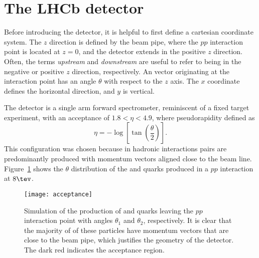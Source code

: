 \section{The LHCb detector}

Before introducing the \lhcb detector, it is helpful to first define a cartesian coordinate system.
The $z$ direction is defined by the \lhc beam pipe, where the $pp$ interaction point is located
at $z=0$, and the \lhcb detector extends in the positive $z$ direction.
Often, the terms \emph{upstream} and \emph{downstream} are useful to refer to being in the
negative or positive $z$ direction, respectively.
An vector originating at the interaction point has an angle $\theta$ with respect to the $z$ axis.
The $x$ coordinate defines the horizontal direction, and $y$ is vertical.

The \lhcb detector is a single arm forward spectrometer, reminiscent of a fixed target experiment,
with an acceptance of $1.8<\eta<4.9$, where pseudorapidity defined as
\begin{equation}
  \eta = -\log\left[\tan\left(\frac\theta2\right)\right].
\end{equation}
This configuration was chosen because in hadronic interactions \bbbar pairs are predominantly
produced with momentum vectors aligned close to the beam line.
Figure~\ref{fig:lhcb:bbbar} shows the $\theta$ distribution of the \bquark and \bquarkbar quarks
produced in a $pp$ interaction at $8\tev$.

\begin{figure}
  \begin{center}
    \texttt{[image: acceptance]}
  \end{center}
  \caption[Simulated production of $b\bar b$ pairs]
  {\small
    Simulation of the production of \bquark and \protect\bquarkbar quarks leaving the $pp$
    interaction point with angles $\theta_1$ and $\theta_2$, respectively.
    It is clear that the majority of of these particles have momentum vectors that are close to the
    beam pipe, which justifies the geometry of the \lhcb detector.
    The dark red indicates the \lhcb acceptance region.
  }
  \label{fig:lhcb:bbbar}
\end{figure}






